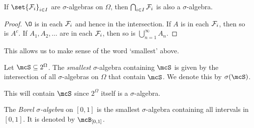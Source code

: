 \begin{exercise}
    If $\set{\F_i}_{i \in I}$ are $\sigma$-algebras on $\Omega$, then
    $\bigcap_{i \in I} \mathcal F_i$ is also a $\sigma$-algebra.
\end{exercise}
\begin{proof}
    $\O$ is in each $\mathcal F_i$ and hence in the intersection.
    If $A$ is in each $\mathcal F_i$, then so is $A^c$.
    If $A_1, A_2, \ldots$ are in each $\mathcal F_i$, then so is
    $\bigcup_{n=1}^\infty A_n$.
\end{proof}

This allows us to make sense of the word `smallest' above.
\begin{definition} \label{def:sigma:gen}
    Let $\mcS \subseteq 2^\Omega$.
    The \emph{smallest} $\sigma$-algebra containing $\mcS$ is given by the
    intersection of all $\sigma$-algebras on $\Omega$ that contain $\mcS$.
    We denote this by $\sigma(\mcS)$.
\end{definition}
This will contain $\mcS$ since $2^\Omega$ itself is a $\sigma$-algebra.

\begin{example}
    The \emph{Borel $\sigma$-algebra} on $[0, 1]$ is the smallest
    $\sigma$-algebra containing all intervals in $[0, 1]$.
    It is denoted by $\mcB_{[0, 1]}$.
\end{example}
